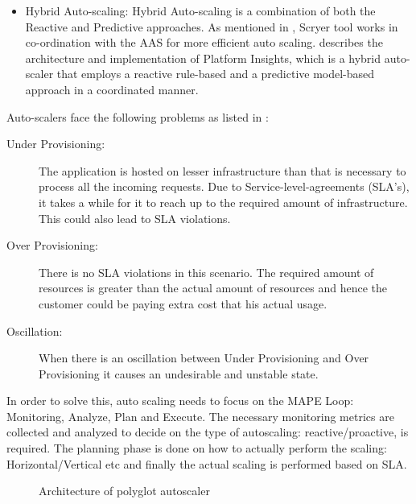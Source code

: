 \documentclass[article,type=msc,colorback,12pt,accentcolor=tud7b]{tudthesis}
\begin{document}
\begin{itemize}
\item{Hybrid Auto-scaling: } Hybrid Auto-scaling is a combination of both the Reactive and Predictive approaches. As mentioned in \cite{Scryer1}, Scryer tool works in co-ordination with the AAS for more efficient auto scaling. \cite{moore2013coordinated} describes the architecture and implementation of Platform Insights, which is a hybrid auto-scaler that employs a reactive rule-based and a predictive model-based approach in a coordinated manner.

\end{itemize}

Auto-scalers face the following problems as listed in \cite{lorido2014review}:

\begin{description}

	\item[Under Provisioning:] The application is hosted on lesser infrastructure than that is necessary to process all the incoming requests. Due to Service-level-agreements (SLA's), it takes a while for it to reach up to the required amount of infrastructure. This could also lead to SLA violations.
	
	\item[Over Provisioning:] There is no SLA violations in this scenario. The required amount of resources is greater than the actual amount of resources and hence the customer could be paying extra cost that his actual usage.
	
	\item[Oscillation:]
		When there is an oscillation between Under Provisioning and Over Provisioning it causes an undesirable and unstable state. 
\end{description}

In order to solve this, auto scaling needs to focus on the MAPE Loop\cite{lorido2014review}: Monitoring, Analyze, Plan and Execute. The necessary monitoring metrics are collected and analyzed to decide on the type of autoscaling: reactive/proactive, is required. The planning phase is done on how to actually perform the scaling: Horizontal/Vertical etc and finally the actual scaling is performed based on SLA.

 \begin{figure}
 \begin{center}
  \makebox[\textwidth]{\texttt{[image: B4]}}
\end{center}
\caption{Architecture of polyglot autoscaler \cite{seelam2015polyglot}}
\end{figure}
\end{document}
